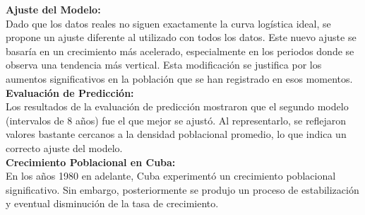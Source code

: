 \documentclass[a4paper,10pt,twocolumn]{article}
\begin{document}
\textbf{Ajuste del Modelo:}\\
Dado que los datos reales no siguen exactamente la curva logística ideal, se propone un ajuste diferente al utilizado con todos los datos. Este nuevo ajuste se basaría en un crecimiento más acelerado, especialmente en los periodos donde se observa una tendencia más vertical. Esta modificación se justifica por los aumentos significativos en la población que se han registrado en esos momentos.\\
\textbf{Evaluación de Predicción:}\\
Los resultados de la evaluación de predicción mostraron que el segundo modelo (intervalos de 8 años) fue el que mejor se ajustó. Al representarlo, se reflejaron valores bastante cercanos a la densidad poblacional promedio, lo que indica un correcto ajuste del modelo.\\
\textbf{Crecimiento Poblacional en Cuba:}\\
En los años 1980 en adelante, Cuba experimentó un crecimiento poblacional significativo. Sin embargo, posteriormente se produjo un proceso de estabilización y eventual disminución de la tasa de crecimiento.


\end{document}
